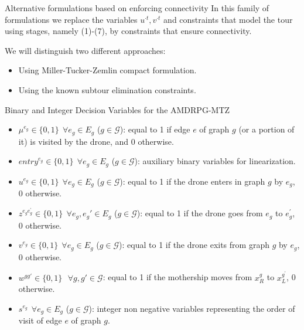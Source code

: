 \documentclass[slidestop,usepdftitle=false,10pt]{beamer}
\begin{document}
	\begin{frame}{Alternative formulations based on enforcing connectivity}
	    In this family of formulations we replace the variables $u^{\cdot t}, v^{\cdot t}$ and constraints that model the tour using stages, namely (1)-(7), by constraints that ensure connectivity.
	    
	    \bigskip
	    
	    We will distinguish two different approaches:
    	\begin{itemize}
    		\item Using Miller-Tucker-Zemlin compact formulation.
    		\item Using the known subtour elimination constraints.
    	\end{itemize}
	\end{frame}
	
	\begin{frame}{\large Binary and Integer Decision Variables for the AMDRPG-MTZ}
	\begin{itemize}
	    \small
	    \item $\mu^{e_g} \in \{0,1\} \:\: \forall e_g \in E_g$ ($g \in \mathcal{G}$): equal to 1 if edge $e$ of graph $g$ (or a portion of it) is visited by the drone, and 0 otherwise.
        \item $entry^{e_g} \in \{0,1\} \:\: \forall e_g \in E_g$ ($g \in \mathcal{G}$): auxiliary binary variables for linearization.
        \item $u^{e_{g}} \in \{0,1\} \:\: \forall e_g \in E_g$ ($g \in \mathcal{G}$): equal to 1 if the drone enters in graph $g$ by $e_g$, 0 otherwise.
        \item $z^{e_{g}e^{'}_{g}} \in \{0,1\} \:\: \forall e_g, e_g' \in E_g$ ($g \in \mathcal{G}$): equal to 1 if the drone goes from $e_g$ to $e^{'}_{g}$, 0 otherwise.
        \item $v^{e_{g}} \in \{0,1\} \:\: \forall e_g \in E_g$ ($g \in \mathcal{G}$): equal to 1 if the drone exits from graph $g$ by $e_g$, 0 otherwise.
        \item $w^{gg'} \in \{0,1\} \:\:\ \forall g,g' \in \mathcal{G}$: equal to 1 if the mothership moves from $x_R^g$ to $x_L^{g^'}$, 0 otherwise.
        \item $s^{e_g} \:\: \forall e_g \in E_g$ ($g \in \mathcal{G}$): integer non negative variables representing the order of visit of edge $e$ of graph $g$.
    \end{itemize}
	\end{frame}
	
\end{document}

